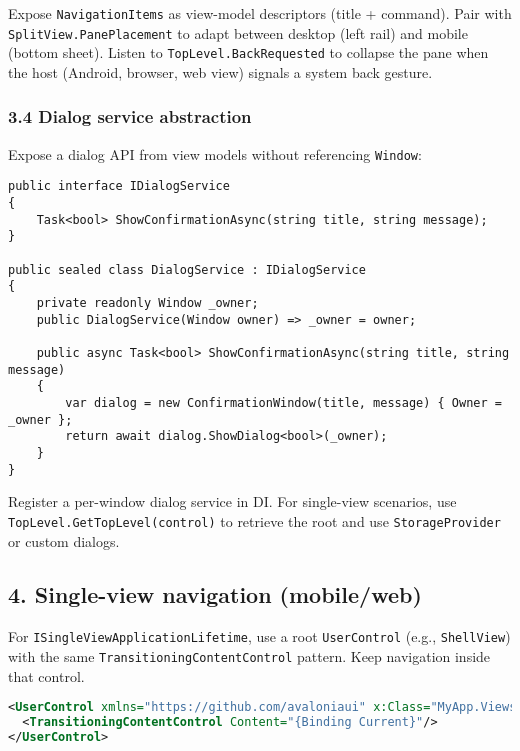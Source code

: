 Expose \passthrough{\lstinline!NavigationItems!} as view-model
descriptors (title + command). Pair with
\passthrough{\lstinline!SplitView.PanePlacement!} to adapt between
desktop (left rail) and mobile (bottom sheet). Listen to
\passthrough{\lstinline!TopLevel.BackRequested!} to collapse the pane
when the host (Android, browser, web view) signals a system back
gesture.

\subsubsection{3.4 Dialog service
abstraction}\label{dialog-service-abstraction}

Expose a dialog API from view models without referencing
\passthrough{\lstinline!Window!}:

\begin{lstlisting}
public interface IDialogService
{
    Task<bool> ShowConfirmationAsync(string title, string message);
}

public sealed class DialogService : IDialogService
{
    private readonly Window _owner;
    public DialogService(Window owner) => _owner = owner;

    public async Task<bool> ShowConfirmationAsync(string title, string message)
    {
        var dialog = new ConfirmationWindow(title, message) { Owner = _owner };
        return await dialog.ShowDialog<bool>(_owner);
    }
}
\end{lstlisting}

Register a per-window dialog service in DI. For single-view scenarios,
use \passthrough{\lstinline!TopLevel.GetTopLevel(control)!} to retrieve
the root and use \passthrough{\lstinline!StorageProvider!} or custom
dialogs.

\subsection{4. Single-view navigation
(mobile/web)}\label{single-view-navigation-mobileweb}

For \passthrough{\lstinline!ISingleViewApplicationLifetime!}, use a root
\passthrough{\lstinline!UserControl!} (e.g.,
\passthrough{\lstinline!ShellView!}) with the same
\passthrough{\lstinline!TransitioningContentControl!} pattern. Keep
navigation inside that control.

\begin{lstlisting}[language=XML]
<UserControl xmlns="https://github.com/avaloniaui" x:Class="MyApp.Views.ShellView">
  <TransitioningContentControl Content="{Binding Current}"/>
</UserControl>
\end{lstlisting}

